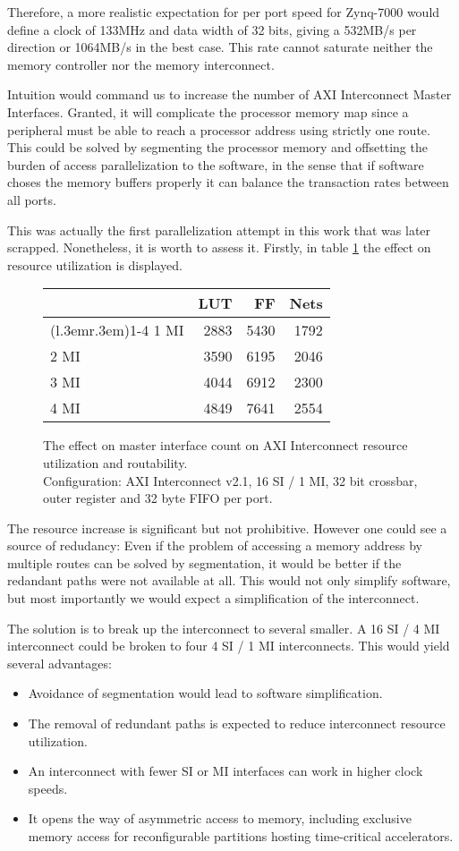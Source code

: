 Therefore, a more realistic expectation for per port speed for Zynq-7000 
would define a clock of 133MHz and data width of 32 bits, giving a 532MB/s
per direction or 1064MB/s in the best case. This rate cannot saturate
neither the memory controller nor the memory interconnect.

Intuition would command us to increase the number of AXI Interconnect
Master Interfaces. Granted, it will complicate the processor memory map
since a peripheral must be able to reach a processor address using
strictly one route. This could be solved by segmenting the processor memory
and offsetting the burden of access parallelization to the software,
in the sense that if software choses the memory buffers properly
it can balance the \gls{transaction} rates between all ports.

This was actually the first parallelization attempt 
in this work that was later scrapped. 
Nonetheless, it is worth to assess it. Firstly, in table \ref{tab:int-mmi}
the effect on resource utilization is displayed.

\begin{figure}[ht!]
\centering
\begin{tabular}{lrrr}
\toprule
	& LUT	& FF	& Nets \\
\cmidrule(l{.3em}r{.3em}){1-4}
1 MI	& 2883	& 5430	& 1792	\\
2 MI	& 3590	& 6195	& 2046	\\
3 MI	& 4044	& 6912	& 2300	\\
4 MI	& 4849	& 7641	& 2554	\\
\bottomrule
\end{tabular}
\caption{The effect on master interface count on AXI Interconnect resource utilization and routability.\\
	Configuration: AXI Interconnect v2.1, 16 SI / 1 MI, 32 bit crossbar, 
	outer register and 32 byte FIFO per port.}
\label{tab:int-mmi}
\end{figure}

The resource increase is significant but not prohibitive. 
However one could see a source of redudancy: Even if the problem
of accessing a memory address by multiple routes can be solved by segmentation,
it would be better if the redandant paths were not available at all.
This would not only simplify software, but most importantly we would expect
a simplification of the interconnect.

The solution is to break up the interconnect to several smaller. 
A 16 SI / 4 MI interconnect could be
broken to four 4 SI / 1 MI interconnects. 
This would yield several advantages:
\begin{itemize}
\item	Avoidance of segmentation would lead to software simplification.
\item	The removal of redundant paths is expected to reduce interconnect resource utilization.
\item	An interconnect with fewer SI or MI interfaces can work in higher clock speeds.
\item	It opens the way of asymmetric access to memory, including exclusive memory access
	for reconfigurable partitions hosting time-critical accelerators.
\end{itemize}
 
